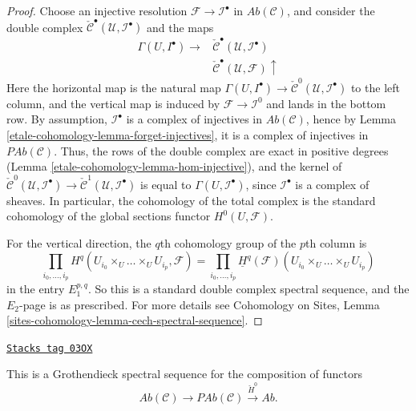 \begin{proof}
Choose an injective resolution $\mathcal{F}\to \mathcal{I}^\bullet$ in
$\textit{Ab}(\mathcal{C})$, and consider the double complex
$\check{\mathcal{C}}^\bullet(\mathcal{U}, \mathcal{I}^\bullet)$
and the maps
$$
\begin{array}{cc}\Gamma(U, I^\bullet) \longrightarrow & \check{\mathcal{C}}^\bullet(\mathcal{U}, \mathcal{I}^\bullet) \\  & \check{\mathcal{C}}^\bullet(\mathcal{U}, \mathcal{F}) \uparrow\end{array}
$$
Here the horizontal map is the natural map
$\Gamma(U, I^\bullet) \to
\check{\mathcal{C}}^0(\mathcal{U}, \mathcal{I}^\bullet)$
to the left column, and the vertical map is induced by
$\mathcal{F}\to \mathcal{I}^0$ and lands in the bottom row.
By assumption, $\mathcal{I}^\bullet$ is a complex of injectives in
$\textit{Ab}(\mathcal{C})$, hence by
Lemma \ref{etale-cohomology-lemma-forget-injectives}, it is a complex of injectives in
$\textit{PAb}(\mathcal{C})$. Thus, the rows of the double complex are
exact in positive degrees (Lemma \ref{etale-cohomology-lemma-hom-injective}), and
the kernel of $\check{\mathcal{C}}^0(\mathcal{U}, \mathcal{I}^\bullet)
\to \check{\mathcal{C}}^1(\mathcal{U}, \mathcal{I}^\bullet)$
is equal to
$\Gamma(U, \mathcal{I}^\bullet)$, since $\mathcal{I}^\bullet$
is a complex of sheaves. In particular, the cohomology of the total complex
is the standard
cohomology of the global sections functor $H^0(U, \mathcal{F})$.

\medskip\noindent
For the vertical direction, the $q$th cohomology group of the $p$th column is
$$
\prod_{i_0, \ldots, i_p}
H^q(U_{i_0} \times_U \ldots \times_U U_{i_p}, \mathcal{F})
=
\prod_{i_0, \ldots, i_p}
\underline{H}^q(\mathcal{F})(U_{i_0} \times_U \ldots \times_U U_{i_p})
$$
in the entry $E_1^{p, q}$. So this is a standard double complex spectral
sequence, and the $E_2$-page is as prescribed. For more details see
Cohomology on Sites,
Lemma \ref{sites-cohomology-lemma-cech-spectral-sequence}.
\end{proof}

\begin{remark}[Grothendieck ss]
\label{etale-cohomology-remark-grothendieck-ss}
\href{https://stacks.math.columbia.edu/tag/03OX}{\texttt{Stacks tag 03OX}}

This is a Grothendieck spectral sequence for the composition of functors
$$
\textit{Ab}(\mathcal{C}) \longrightarrow
\textit{PAb}(\mathcal{C}) \xrightarrow{\check H^0} \textit{Ab}.
$$
\end{remark}

